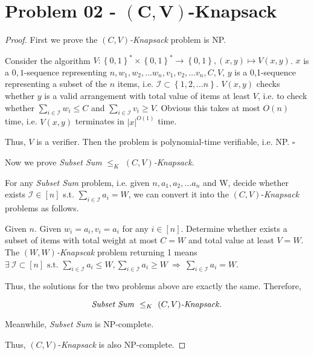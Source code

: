 \documentclass{article}
\newcommand{\whiteqed}{\hfill $\square$\par}
\newcommand{\set}[1]{\left\{#1\right\}}
\begin{document}
\section{Problem 02 - $\boldsymbol{(C,V)}$-Knapsack}
\vspace{1em}
\begin{proof}
    First we prove the $(C,V)$\textit{-Knapsack} problem is NP.
    
    \hspace{1.3em}
    Consider the algorithm $V:\set{0,1}^*\times\set{0,1}^*\rightarrow\set{0,1},(x,y)\mapsto V(x,y)$. $x$ is a $0,1$-sequence representing $n,w_1,w_2,...w_n,v_1,v_2,...v_n,C,V$, $y$ is a 0,1-sequence representing a subset of the $n$ items, i.e. $\mathcal{I}\subset\set{1,2,...n}$. $V(x,y)$ checks whether $y$ is a valid arrangement with total value of items at least $V$, i.e. to check whether $\sum_{i\in\mathcal{I}}w_i\le C$ and $\sum_{i\in\mathcal{I}}v_i\geq V$. Obvious this takes at most $O(n)$ time, i.e. $V(x,y)$ terminates in $|x|^{O(1)}$ time.
    
    \hspace{1.3em}
    Thus, $V$ is a verifier. Then the problem is polynomial-time verifiable, i.e. NP. \whiteqed
    
    \vspace{1em} \hspace{1.3em}
    Now we prove \textit{Subset Sum} $\le_K$ \textit{$(C,V)$-Knapsack}.
    
    \hspace{1.3em}
    For any \textit{Subset Sum} problem, i.e. given $n, a_1, a_2,...a_n$ and W, decide whether exists $\mathcal{I}\in[n]$ s.t. $\sum_{i\in\mathcal{I}} a_i=W$, we can convert it into the $(C,V)$-\textit{Knapsack} problems as follows.
    
    \hspace{1.3em}
    Given $n$. Given $w_i=a_i, v_i=a_i$ for any $i\in[n]$. Determine whether exists a subset of items with total weight at most $C=W$ and total value at least $V=W$. The $(W,W)$\textit{-Knapscak} problem returning 1 means $\exists\ \mathcal{I}\subset[n]\text{\ s.t.\ }\sum_{i\in\mathcal{I}}a_i\le W, \sum_{i\in\mathcal{I}}a_i\geq W\ \Longrightarrow\ \sum_{i\in\mathcal{I}}a_i=W$.
    
    \hspace{1.3em}
    Thus, the solutions for the two problems above are exactly the same. Therefore,
    
    \vspace{-1.5em}
    $$\text{\textit{Subset Sum}}\ \le_K\ \text{\textit{$(C,V)$-Knapsack}}.$$
    
    \vspace{-0.5em} \hspace{1.3em}
    Meanwhile, \textit{Subset Sum} is NP-complete.
    
    \hspace{1.3em}
    Thus, $(C,V)$-\textit{Knapsack} is also NP-complete.
\end{proof}
\end{document}
